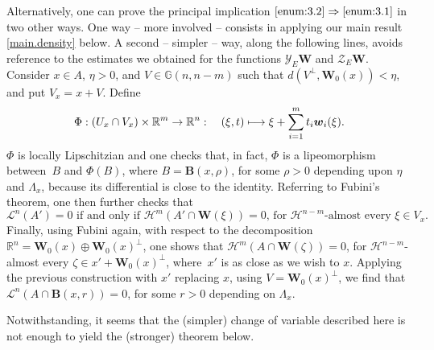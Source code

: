 \documentclass[JEP,XML,SOM,Unicode,ThmDefs,NoEqCountersInSection]{cedram}
\newcommand\mto{\mathchoice{\longmapsto}{\mapsto}{\mapsto}{\mapsto}}
\newcommand{\R}{\mathbb{R}}
\newcommand{\Rm}{\R^m}
\newcommand{\Rn}{\R^n}
\newcommand{\calH}{\mathscr{H}}
\newcommand{\calL}{\mathscr{L}}
\newcommand{\calY}{\mathscr{Y}}
\newcommand{\calZ}{\mathscr{Z}}
\newcommand{\bB}{{\boldsymbol{B}}}
\newcommand{\bW}{{\boldsymbol{W}}}
\newcommand{\bw}{{\boldsymbol{w}}}
\newcommand{\bG}{\mathbb{G}}
\begin{document}
\begin{Remark}
\label{remark}
Alternatively, one can prove the principal implication $\eqref{enum:3.2}\Rightarrow \eqref{enum:3.1}$ in two other ways.
One way -- more involved -- consists in applying our main result \ref{main.density} below.
A second -- simpler -- way, along the following lines, avoids reference to the estimates we obtained for the functions $\calY_E \bW$ and $\calZ_E \bW$.
Consider $x \in A$, $\eta > 0$, and $V \in \bG(n,n-m)$ such that $d\left(V^\perp, \bW_0(x) \right) < \eta$, and put $V_x = x + V$.
Define
\begin{equation*}
\Phi: (U_x \cap V_x) \times \Rm \to \Rn:\quad (\xi,t) \mto \xi + \sum_{i=1}^m t_i \bw_i(\xi).
\end{equation*}
$\Phi$ is locally Lipschitzian and one checks that, in fact, $\Phi$ is a lipeomorphism between~$B$ and $\Phi(B)$, where $B = \bB(x,\rho)$, for some $\rho > 0$ depending upon $\eta$ and $\Lambda_x$, because its differential is close to the identity.
Referring to Fubini's theorem, one then further checks that
\begin{equation*}
\calL^n(A') = 0 \text{ if and only if } \calH^m(A' \cap \bW(\xi)) = 0 \text{, for $\calH^{n-m}$-almost every } \xi \in V_x.
\end{equation*}
Finally, using Fubini again, with respect to the decomposition $\Rn = \bW_0(x) \oplus \bW_0(x)^\perp$, one shows that $\calH^m(A \cap \bW(\zeta))=0$, for $\calH^{n-m}$-almost every $\zeta \in x' + \bW_0(x)^\perp$, where~$x'$ is as close as we wish to $x$.
Applying the previous construction with $x'$ replacing $x$, using $V = \bW_0(x)^\perp$, we find that $\calL^n(A \cap \bB(x,r))=0$, for some $r > 0$ depending on $\Lambda_x$.
\par
Notwithstanding, it seems that the (simpler) change of variable described here is not enough to yield the (stronger) theorem below.
\end{Remark}
\end{document}
